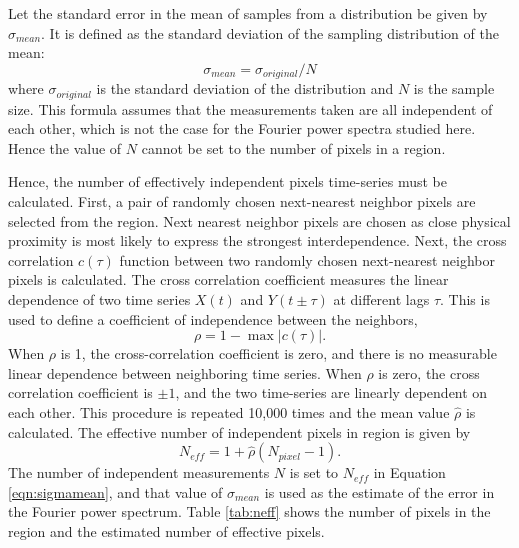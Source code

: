 \documentclass[onecolumn]{emulateapj}
\newcommand{\PS}{power spectrum}
\newcommand{\Fps}{Fourier \PS}
\begin{document}
Let the standard error in the mean of samples from a distribution be
given by $\sigma_{mean}$.  It is defined as the standard deviation of
the sampling distribution of the mean:
\begin{equation}
\sigma_{mean} = \sigma_{original} / N
\label{eqn:sigmamean}
\end{equation}
where $\sigma_{original}$ is the standard deviation of the
distribution and $N$ is the sample size.  This formula assumes that
the measurements taken are all independent of each other, which is not
the case for the Fourier power spectra studied here.  Hence the value
of $N$ cannot be set to the number of pixels in a region.

Hence, the number of effectively independent pixels time-series must
be calculated.  First, a pair of randomly chosen next-nearest neighbor
pixels are selected from the region.  Next nearest neighbor pixels are
chosen as close physical proximity is most likely to express the
strongest interdependence.  Next, the cross correlation $c(\tau)$
function between two randomly chosen next-nearest neighbor pixels is
calculated.  The cross correlation coefficient measures the linear
dependence of two time series $X(t)$ and $Y(t \pm \tau)$ at different
lags $\tau$.  This is used to define a coefficient of independence
between the neighbors,
\begin{equation}
\label{eqn:ind}
\rho = 1 - \max|c(\tau)|.
\end{equation}
When $\rho$ is 1, the cross-correlation coefficient is zero, and there
is no measurable linear dependence between neighboring time series.
When $\rho$ is zero, the cross correlation coefficient is $\pm 1$, and
the two time-series are linearly dependent on each other.  This
procedure is repeated 10,000 times and the mean value $\hat{\rho}$ is
calculated. The effective number of independent pixels in region is
given by
\begin{equation}
\label{eqn:nind}
N_{eff}= 1 + \hat{\rho}(N_{pixel}-1).
\end{equation}
The number of independent measurements $N$ is set to $N_{eff}$ in
Equation \ref{eqn:sigmamean}, and that value of $\sigma_{mean}$ is
used as the estimate of the error in the \Fps.  Table \ref{tab:neff}
shows the number of pixels in the region and the estimated number of
effective pixels.
\end{document}
